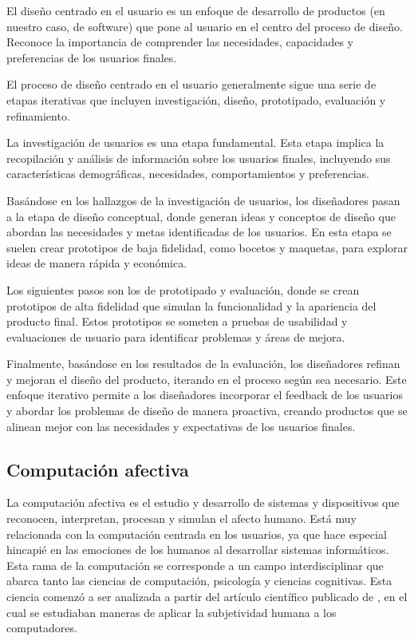 El diseño centrado en el usuario es un enfoque de desarrollo de productos (en nuestro caso, de software) que pone al usuario en el centro del proceso de diseño. Reconoce la importancia de comprender las necesidades, capacidades y preferencias de los usuarios finales.

El proceso de diseño centrado en el usuario generalmente sigue una serie de etapas iterativas que incluyen investigación, diseño, prototipado, evaluación y refinamiento.

La investigación de usuarios es una etapa fundamental. Esta etapa implica la recopilación y análisis de información sobre los usuarios finales, incluyendo sus características demográficas, necesidades, comportamientos y preferencias.

Basándose en los hallazgos de la investigación de usuarios, los diseñadores pasan a la etapa de diseño conceptual, donde generan ideas y conceptos de diseño que abordan las necesidades y metas identificadas de los usuarios. En esta etapa se suelen crear prototipos de baja fidelidad, como bocetos y maquetas, para explorar ideas de manera rápida y económica.

Los siguientes pasos son los de prototipado y evaluación, donde se crean prototipos de alta fidelidad que simulan la funcionalidad y la apariencia del producto final. Estos prototipos se someten a pruebas de usabilidad y evaluaciones de usuario para identificar problemas y áreas de mejora.

Finalmente, basándose en los resultados de la evaluación, los diseñadores refinan y mejoran el diseño del producto, iterando en el proceso según sea necesario. Este enfoque iterativo permite a los diseñadores incorporar el feedback de los usuarios y abordar los problemas de diseño de manera proactiva, creando productos que se alinean mejor con las necesidades y expectativas de los usuarios finales.

\subsection{Computación afectiva}

La computación afectiva es el estudio y desarrollo de sistemas y dispositivos que reconocen, interpretan, procesan y simulan el afecto humano. Está muy relacionada con la computación centrada en los usuarios, ya que hace especial hincapié en las emociones de los humanos al desarrollar sistemas informáticos. Esta rama de la computación se corresponde a un campo interdisciplinar que abarca tanto las ciencias de computación, psicología y ciencias cognitivas. Esta ciencia comenzó a ser analizada a partir del artículo científico publicado de \cite{picard1995computer}, en el cual se estudiaban maneras de aplicar la subjetividad humana a los computadores.


